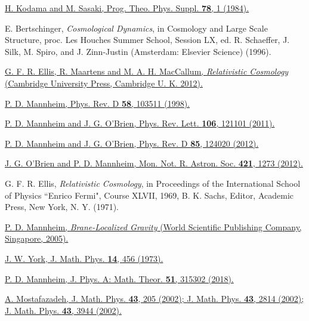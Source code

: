\documentclass[aps]{revtex4}
\begin{document}
\begin{thebibliography}{99}
 \href{https://doi.org/10.1143/PTPS.78.1}{H. Kodama and M. Sasaki, Prog. Theo. Phys. Suppl. {\bf 78}, 1 (1984).}

 E. Bertschinger, {\it Cosmological Dynamics}, in Cosmology and Large Scale Structure, proc. Les Houches Summer School, Session LX, ed. R. Schaeffer, J. Silk, M. Spiro, and J. Zinn-Justin (Amsterdam: Elsevier Science) (1996).

 \href{https://doi.org/10.1017/CBO9781139014403}{G. F. R. Ellis, R. Maartens and  M. A. H. MacCallum, {\it Relativistic Cosmology} (Cambridge University Press,  Cambridge U. K. 2012).}

 \href{https://doi.org/10.1103/PhysRevD.58.103511}{P. D. Mannheim, Phys. Rev. D {\bf 58}, 103511 (1998).}

 \href{https://doi.org/10.1103/PhysRevLett.106.121101}{P. D. Mannheim and J. G. O'Brien, Phys. Rev. Lett. \textbf{106}, 121101 (2011).}

 \href{https://doi.org/10.1103/PhysRevD.85.124020}{P. D. Mannheim and J. G. O'Brien, Phys. Rev. D \textbf{85}, 124020 (2012).}

 \href{https://doi.org/10.1111/j.1365-2966.2011.20386.x}{J. G. O'Brien and P. D. Mannheim, Mon. Not. R. Astron. Soc. \textbf{421}, 1273 (2012).}

 G. F. R. Ellis, {\it Relativistic Cosmology}, in Proceedings of the International School of Physics ``Enrico Fermi", Course XLVII, 1969, B. K. Sachs, Editor, Academic Press, New York, N. Y. (1971).

  \href{https://doi.org/10.1142/5975}{P. D. Mannheim, \textit{Brane-Localized Gravity} (World Scientific Publishing Company, Singapore, 2005).}

 \href{https://doi.org/10.1063/1.1666338}{J. W. York, J. Math. Phys. \textbf{14}, 456 (1973).}

 \href{http://iopscience.iop.org/article/10.1088/1751-8121/aac035/meta}{P. D. Mannheim, J. Phys. A: Math. Theor. {\bf 51}, 315302 (2018).}

  \href{https://doi.org/10.1063/1.1418246}{A. Mostafazadeh, J. Math. Phys. \textbf {43}, 205 (2002); }\href{https://doi.org/10.1063/1.1461427}{J. Math. Phys. \textbf {43}, 2814 (2002); }\href{https://doi.org/10.1063/1.1489072}{J. Math. Phys. \textbf {43}, 3944 (2002).}


\end{thebibliography}
\end{document}
